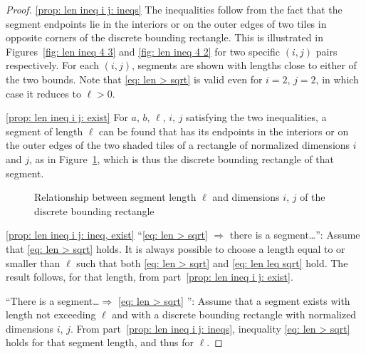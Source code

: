 \documentclass[12pt, a4paper]{article}
\newcommand{\len}{\ell} %
\begin{document}
\begin{proof}
\ref*{prop: len ineq i j: ineqs} The inequalities follow from the fact that the segment endpoints lie in the interiors or on the outer edges of two tiles in opposite corners of the discrete bounding rectangle. This is illustrated in Figures~\ref{fig: len ineq 4 3} and \ref{fig: len ineq 4 2} for two specific $(i,j)$ pairs respectively. For each $(i,j)$, segments are shown with lengths close to either of the two bounds. Note that \eqref{eq: len > sqrt} is valid even for $i=2$, $j=2$, in which case it reduces to $\len>0$.

\ref*{prop: len ineq i j: exist} For $a$, $b$, $\len$, $i$, $j$ satisfying the two inequalities, a segment of length $\len$ can be found that has its endpoints in the interiors or on the outer edges of the two shaded tiles of a rectangle of normalized dimensions $i$ and $j$, as in Figure~\ref{fig: len ineq i j}, which is thus the discrete bounding rectangle of that segment.
\begin{figure}
\centering%
\hfill%
%
\caption{Relationship between segment length $\len$ and dimensions $i$, $j$ of the discrete bounding rectangle
}%
\label{fig: len ineq i j}
\end{figure}%

\ref*{prop: len ineq i j: ineq, exist} ``\eqref{eq: len > sqrt} $\Rightarrow$ there is a segment\ldots'': Assume that \eqref{eq: len > sqrt} holds. It is always possible to choose a length equal to or smaller than $\len$ such that both \eqref{eq: len > sqrt} and \eqref{eq: len leq sqrt} hold. The result follows, for that length, from part~\ref{prop: len ineq i j: exist}.

``There is a segment\ldots $\Rightarrow$ \eqref{eq: len > sqrt} '': Assume that a segment exists with length not exceeding $\len$ and with a discrete bounding rectangle with normalized dimensions $i$, $j$. From part~\ref{prop: len ineq i j: ineqs}, inequality \eqref{eq: len > sqrt} holds for that segment length, and thus for $\len$.
\end{proof}
\end{document}
